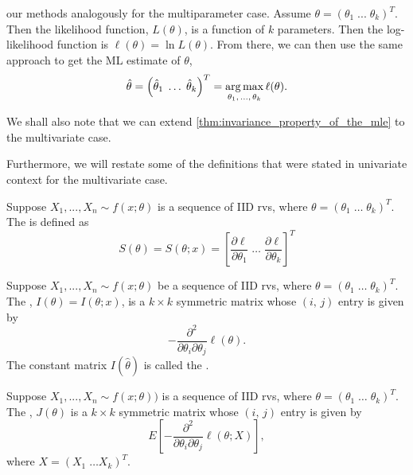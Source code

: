 \documentclass[notoc,notitlepage]{tufte-book}
\begin{document}
 our methods analogously for the multiparameter case. Assume $\theta = ( \theta_1 \; ... \; \theta_k )^{T}$. Then the likelihood function, $L(\theta)$, is a function of $k$ parameters. Then the log-likelihood function is $\ell(\theta) = \ln L(\theta)$. From there, we can then use the same approach to get the ML estimate of $\theta$,
\begin{equation*}
  \hat{\theta} = \left( \hat{\theta}_1 \; \hdots \; \hat{\theta}_k \right)^{T} = \operatorname*{arg\,max}_{\theta_1, \, ..., \, \theta_k} \ell(\theta).
\end{equation*}

We shall also note that we can extend \cref{thm:invariance_property_of_the_mle} to the multivariate case.

Furthermore, we will restate some of the definitions that were stated in univariate context for the multivariate case.

\begin{defn}
\label{defn:score_vector}
  Suppose $X_1, ..., X_n \sim f(x; \theta)$ is a sequence of IID rvs, where $\theta = (\theta_1 \; \hdots \; \theta_k)^T$. The  is defined as
  \begin{equation*}
    S(\theta) = S(\theta; x) = \left[ \frac{\partial \ell}{\partial \theta_1} \; \hdots \; \frac{\partial \ell}{\partial \theta_k} \right]^T
  \end{equation*}
\end{defn}

\begin{defn}
\label{defn:information_matrix}
Suppose $X_1, ..., X_n \sim f(x; \theta)$ be a sequence of IID rvs, where $\theta = (\theta_1 \; \hdots \; \theta_k)^T$. The , $I(\theta) = I(\theta; x)$, is a $k \times k$ symmetric matrix whose $(i, \, j)$ entry is given by
\begin{equation*}
  - \frac{\partial^2}{\partial \theta_i \partial \theta_j} \ell(\theta).
\end{equation*}
The constant matrix $I(\hat{\theta})$ is called the .
\end{defn}

\begin{defn}
\label{defn:fisher_information_matrix}
  Suppose $X_1, ..., X_n \sim f(x; \theta))$ is a sequence of IID rvs, where $\theta = (\theta_1 \; \hdots \; \theta_k)^T$. The , $J(\theta)$ is a $k \times k$ symmetric matrix whose $(i, \, j)$ entry is given by
  \begin{equation*}
    E\left[ - \frac{\partial^2}{\partial \theta_i \partial \theta_j} \ell(\theta; X) \right],
  \end{equation*}
  where $X = (X_1 \; \hdots X_k)^T$.
\end{defn}
\end{document}

